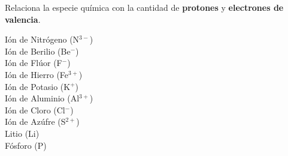 Relaciona la especie química con la cantidad de \textbf{protones} y \textbf{electrones de valencia}.

\begin{multicols}{2}
    \begin{choices}
        \choice Ión de Nitrógeno (N$^{3-}$) \\  
        \choice Ión de Berilio (Be$^{-}$) \\  
        \choice Ión de Flúor   (F$^-$) \\  
        \choice Ión de Hierro (Fe$^{3+}$)  \\  
        \choice Ión de Potasio (K$^+$) \\ 
        \columnbreak
        \choice Ión de Aluminio  (Al$^{3+}$) \\ 
        \choice Ión de Cloro (Cl$^{-}$) \\ 
        \choice Ión de Azúfre (S$^{2+}$) \\ 
        \choice Litio (Li) \\ 
        \choice Fósforo (P)    \\  
    \end{choices}
\end{multicols}

